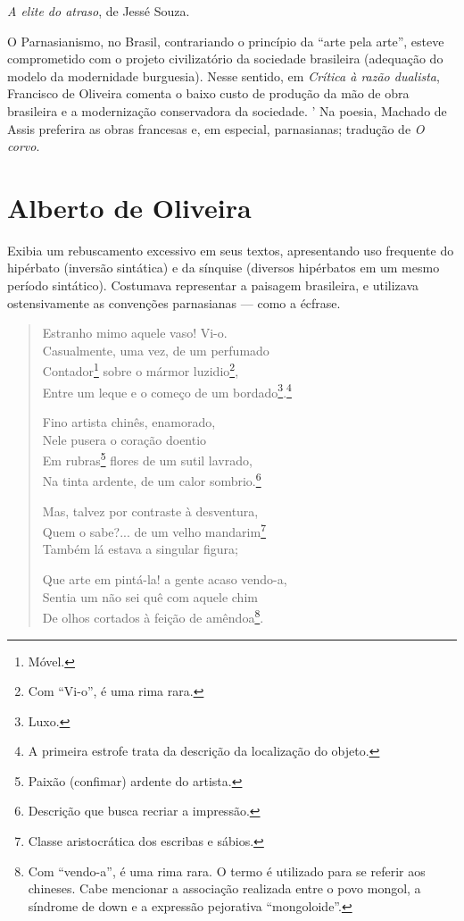 \textit{A elite do atraso}, de Jessé Souza.

O Parnasianismo, no Brasil, contrariando o princípio da ``arte pela arte'', esteve comprometido com o projeto civilizatório da sociedade brasileira (adequação do modelo da modernidade burguesia). Nesse sentido, em \textit{Crítica à razão dualista}, Francisco de Oliveira comenta o baixo custo de produção da mão de obra brasileira e a modernização conservadora da sociedade.
'
Na poesia, Machado de Assis preferira as obras francesas e, em especial, parnasianas; tradução de \textit{O corvo}.

\section{Alberto de Oliveira}

Exibia um rebuscamento excessivo em seus textos, apresentando uso frequente do hipérbato (inversão sintática) e da sínquise (diversos hipérbatos em um mesmo período sintático). Costumava representar a paisagem brasileira, e utilizava ostensivamente as convenções parnasianas — como a écfrase.

\begin{verse}
Estranho mimo aquele vaso! Vi-o. \\
Casualmente, uma vez, de um perfumado \\
Contador\footnote{Móvel.} sobre o mármor luzidio\footnote{Com ``Vi-o'', é uma rima rara.}, \\
Entre um leque e o começo de um bordado\footnote{Luxo.}.\footnote{A primeira estrofe trata da descrição da localização do objeto.}

Fino artista chinês, enamorado, \\
Nele pusera o coração doentio \\
Em rubras\footnote{Paixão (confimar) ardente do artista.} flores de um sutil lavrado, \\
Na tinta ardente, de um calor sombrio.\footnote{Descrição que busca recriar a impressão.}

Mas, talvez por contraste à desventura, \\
Quem o sabe?... de um velho mandarim\footnote{Classe aristocrática dos escribas e sábios.} \\
Também lá estava a singular figura;

Que arte em pintá-la! a gente acaso vendo-a, \\
Sentia um não sei quê com aquele chim \\
De olhos cortados à feição de amêndoa\footnote{Com ``vendo-a'', é uma rima rara. O termo é utilizado para se referir aos chineses. Cabe mencionar a associação realizada entre o povo mongol, a síndrome de down e a expressão pejorativa ``mongoloide''.}.
\end{verse}

